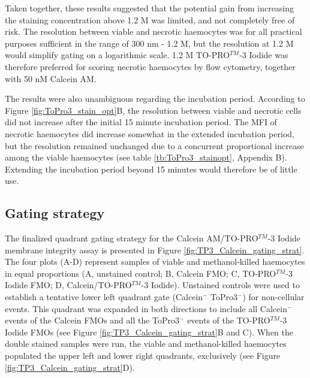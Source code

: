 Taken together, these results suggested that the potential gain from increasing the staining concentration above 1.2 \micro M was limited, and not completely free of risk. The resolution between viable and necrotic haemocytes was for all practical purposes sufficient in the range of 300 nm - 1.2 \micro M, but the resolution at 1.2 \micro M would simplify gating on a logarithmic scale. 1.2 \micro M TO-PRO$^{TM}$-3 Iodide was therefore preferred for scoring necrotic haemocytes by flow cytometry, together with 50 nM Calcein AM.

The results were also unambiguous regarding the incubation period. According to Figure \ref{fig:ToPro3_stain_opt}B, the resolution between viable and necrotic cells did not increase after the initial 15 minute incubation period. The MFI of necrotic haemocytes did increase somewhat in the extended incubation period, but the resolution remained unchanged due to a concurrent proportional increase among the viable haemocytes (see table \ref{tb:ToPro3_stainopt}, Appendix B). Extending the incubation period beyond 15 minutes would therefore be of little use.

\subsection{Gating strategy}
The finalized quadrant gating strategy for the Calcein AM/TO-PRO$^{TM}$-3 Iodide membrane integrity assay is presented in Figure \ref{fig:TP3_Calcein_gating_strat}. The four plots (A-D) represent samples of viable and methanol-killed haemocytes in equal proportions (A, unstained control; B, Calcein FMO; C, TO-PRO$^{TM}$-3 Iodide FMO; D, Calcein/TO-PRO$^{TM}$-3 Iodide). Unstained controls were used to establish a tentative lower left quadrant gate (Calcein$^{-}$ ToPro3$^{-}$) for non-cellular events. This quadrant was expanded in both directions to include all Calcein$^{-}$ events of the Calcein FMOs and all the ToPro3$^{-}$ events of the TO-PRO$^{TM}$-3 Iodide FMOs (see Figure \ref{fig:TP3_Calcein_gating_strat}B and C). When the double stained samples were run, the viable and methanol-killed haemocytes populated the upper left and lower right quadrants, exclusively (see Figure \ref{fig:TP3_Calcein_gating_strat}D).


